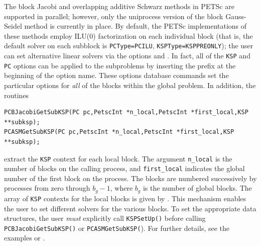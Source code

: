  
  
The block Jacobi and overlapping additive Schwarz methods in PETSc are
supported in parallel; however, only the uniprocess
version of the block Gauss-Seidel method is currently in place.
By default, the PETSc implementations of these methods
employ ILU(0) factorization on each individual block (that is, the default solver on each
subblock is \lstinline{PCType=PCILU}, \lstinline{KSPType=KSPPREONLY}); 
the user can set alternative linear solvers via the options
 
 and . In fact, all of the \lstinline{KSP}
and \lstinline{PC} options can be applied to the subproblems by inserting the prefix
 at the beginning of the option name. 
These options database commands set the particular options for {\em all}
of the blocks within the global problem.  In addition, the routines
\begin{lstlisting}
PCBJacobiGetSubKSP(PC pc,PetscInt *n_local,PetscInt *first_local,KSP **subksp);
PCASMGetSubKSP(PC pc,PetscInt *n_local,PetscInt *first_local,KSP **subksp);
\end{lstlisting}
extract the \lstinline{KSP} context for each local
block.  The argument \lstinline{n_local} is the number of blocks on the
calling process, and \lstinline{first_local} indicates the global number
of the first block on the process. The blocks are numbered
successively by processes from zero through $b_g-1$,
where $b_g$ is the number of global blocks.
The array of \lstinline{KSP} contexts for the local blocks is given by .
This mechanism enables the user to set different solvers for the
various blocks.  To set the appropriate data structures, the
user {\em must} explicitly call \lstinline{KSPSetUp()}
before calling \lstinline{PCBJacobiGetSubKSP()} or
\lstinline{PCASMGetSubKSP(}).
For further details, see the
examples \href{http://www.mcs.anl.gov/petsc/petsc-current/src/ksp/ksp/examples/tutorials/ex7.c.html}{}
or \href{http://www.mcs.anl.gov/petsc/petsc-current/src/ksp/ksp/examples/tutorials/ex7.c.html}{}.

